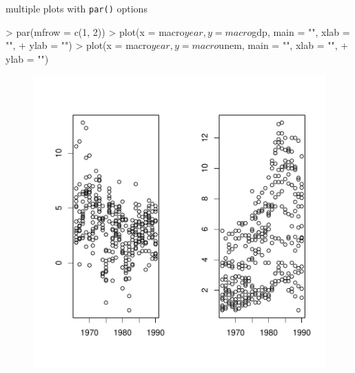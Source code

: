 \documentclass[handout]{beamer}
\newcommand{\red}{\color{red}}
\begin{document}
\begin{frame}[fragile]
multiple plots with {\tt \red par()} options
\red
\footnotesize
\medskip
\begin{Schunk}
\begin{Sinput}
> par(mfrow = c(1, 2))
> plot(x = macro$year, y = macro$gdp, main = "", xlab = "", 
+     ylab = "")
> plot(x = macro$year, y = macro$unem, main = "", xlab = "", 
+     ylab = "")
\end{Sinput}
\end{Schunk}
\end{frame}

\begin{frame}
\begin{figure}
\includegraphics[scale=.5]{rslides-plot5.pdf}
\end{figure}
\end{frame}
\end{document}
